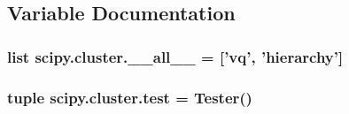 \subsection{Variable Documentation}
\hypertarget{namespacescipy_1_1cluster_a7dfac980b82e8960ad76243be426fa34}{}
\subsubsection[{\+\_\+\+\_\+all\+\_\+\+\_\+}]{\setlength{\rightskip}{0pt plus 5cm}list scipy.\+cluster.\+\_\+\+\_\+all\+\_\+\+\_\+ = \mbox{[}'vq', 'hierarchy'\mbox{]}}\label{namespacescipy_1_1cluster_a7dfac980b82e8960ad76243be426fa34}
\hypertarget{namespacescipy_1_1cluster_acac402aafa03aff490caf26fab80aab4}{}
\subsubsection[{test}]{\setlength{\rightskip}{0pt plus 5cm}tuple scipy.\+cluster.\+test = Tester()}\label{namespacescipy_1_1cluster_acac402aafa03aff490caf26fab80aab4}
